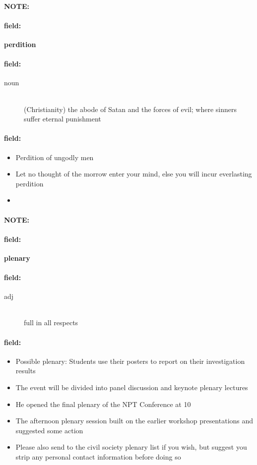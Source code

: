 \documentclass[12pt]{article}
\newenvironment{note}{\paragraph{NOTE:}}{}
\newenvironment{field}{\paragraph{field:}}{}
\begin{document}
\begin{note}
\begin{field}
\textbf{\large perdition}
\end{field}


\begin{field}
\begin{description}
\item[noun] \hfill \\ 
(Christianity) the abode of Satan and the forces of evil; where sinners suffer eternal punishment

\end{description}
\end{field}

\begin{field}
\begin{itemize}
\item Perdition of ungodly men
\item Let no thought of the morrow enter your mind, else you will incur everlasting perdition
\item 
\end{itemize}
\end{field}
\end{note}
\begin{note}
\begin{field}
\textbf{\large plenary}
\end{field}


\begin{field}
\begin{description}
\item[adj] \hfill \\ 
full in all respects

\end{description}
\end{field}

\begin{field}
\begin{itemize}
\item Possible plenary: Students use their posters to report on their investigation results
\item The event will be divided into panel discussion and keynote plenary lectures
\item He opened the final plenary of the NPT Conference at 10
\item The afternoon plenary session built on the earlier workshop presentations and suggested some action
\item Please also send to the civil society plenary list if you wish, but suggest you strip any personal contact information before doing so
\end{itemize}
\end{field}
\end{note}
\end{document}
